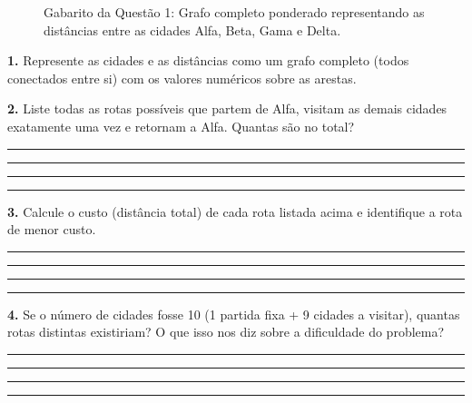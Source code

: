 \documentclass[
  12pt,
  oneside,
  a4paper,
  english,
  brazilian
  ]{abntex2}
\theoremstyle{definition}
\def\vspace#1{ }%
\begin{document}
\begin{apendicesenv}
\begin{figure}[htbp]
    \caption{Gabarito da Questão 1: Grafo completo ponderado representando as distâncias entre as cidades Alfa, Beta, Gama e Delta.}
    \label{fig:caixeiro_viajante}
\end{figure}

\textbf{1.} Represente as cidades e as distâncias como um grafo completo (todos conectados entre si) com os valores numéricos sobre as arestas.

\vspace{4.5cm}

\textbf{2.} Liste todas as rotas possíveis que partem de Alfa, visitam as demais cidades exatamente uma vez e retornam a Alfa. Quantas são no total?

\vspace{0.3cm}
\noindent\rule{\textwidth}{0.4pt}\vspace{0.3cm}
\noindent\rule{\textwidth}{0.4pt}\vspace{0.3cm}
\noindent\rule{\textwidth}{0.4pt}\vspace{0.3cm}
\noindent\rule{\textwidth}{0.4pt}

\textbf{3.} Calcule o custo (distância total) de cada rota listada acima e identifique a rota de menor custo.

\vspace{0.3cm}
\noindent\rule{\textwidth}{0.4pt}\vspace{0.3cm}
\noindent\rule{\textwidth}{0.4pt}\vspace{0.3cm}
\noindent\rule{\textwidth}{0.4pt}\vspace{0.3cm}
\noindent\rule{\textwidth}{0.4pt}

\textbf{4.} Se o número de cidades fosse 10 (1 partida fixa + 9 cidades a visitar), quantas rotas distintas existiriam? O que isso nos diz sobre a dificuldade do problema?

\vspace{0.3cm}
\noindent\rule{\textwidth}{0.4pt}\vspace{0.3cm}
\noindent\rule{\textwidth}{0.4pt}\vspace{0.3cm}
\noindent\rule{\textwidth}{0.4pt}\vspace{0.3cm}
\noindent\rule{\textwidth}{0.4pt}

\end{apendicesenv}
\end{document}
